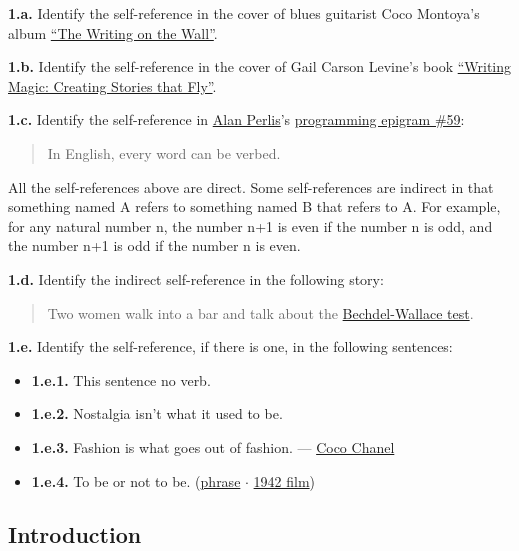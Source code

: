\documentclass[12pt]{article}
\begin{document}
\textbf{1.a.} Identify the self-reference in the cover of blues guitarist Coco
Montoya's album
\href{https://cocomontoya.bandcamp.com/album/writing-on-the-wall}{``The Writing on the Wall''}.

\textbf{1.b.} Identify the self-reference in the cover of Gail Carson Levine's
book
\href{https://www.goodreads.com/book/show/136218.Writing_Magic}{``Writing Magic: Creating Stories that Fly''}.

\textbf{1.c.} Identify the self-reference in
\href{http://en.wikipedia.org/wiki/Alan_Perlis}{Alan Perlis}'s
\href{http://www.cs.yale.edu/homes/perlis-alan/quotes.html}{programming epigram \#59}:

\begin{quote}
In English, every word can be verbed.
\end{quote}

All the self-references above are direct. Some self-references are indirect in
that something named A refers to something named B that refers to A. For
example, for any natural number n, the number n+1 is even if the number n is
odd, and the number n+1 is odd if the number n is even.

\textbf{1.d.} Identify the indirect self-reference in the following story:

\begin{quote}
Two women walk into a bar and talk about the
\href{https://en.wikipedia.org/wiki/Bechdel_test}{Bechdel-Wallace test}.
\end{quote}

\textbf{1.e.} Identify the self-reference, if there is one, in the following
sentences:

\begin{itemize}
\item \textbf{1.e.1.} This sentence no verb.
\item \textbf{1.e.2.} Nostalgia isn't what it used to be.
\item \textbf{1.e.3.} Fashion is what goes out of fashion. ---
  \href{https://en.wikipedia.org/wiki/Coco_Chanel}{Coco Chanel}
\item \textbf{1.e.4.} To be or not to be.
  (\href{https://en.wikipedia.org/wiki/To_be_or_not_to_be}{phrase} $\cdot$
  \href{https://en.wikipedia.org/wiki/To_Be_or_Not_to_Be_(1942_film)}{1942 film})
\end{itemize}


\subsection{Introduction}
\end{document}
